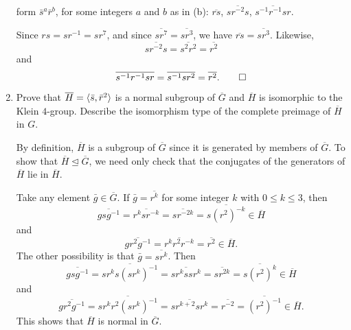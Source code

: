 \begin{enumerate}
  form $\bar s^a\bar r^b$, for some integers $a$ and $b$ as in (b):
  $\overline{rs}$, $\overline{sr^{-2}s}$, $\overline{s^{-1}r^{-1}sr}$.
  \begin{solution}
    Since $rs = sr^{-1} = sr^7$, and since
    $\overline{sr^7} = \overline{sr^3}$, we have
    $\overline{rs} = \overline{sr^3}$. Likewise,
    \begin{equation*}
      \overline{sr^{-2}s} = \overline{s^2r^2} = \overline{r^2}
    \end{equation*}
    and
    \begin{equation*}
      \overline{s^{-1}r^{-1}sr}
      = \overline{s^{-1}sr^2}
      = \overline{r^2}. \qedhere
    \end{equation*}
  \end{solution}
\item Prove that $\overline{H} = \langle{\bar s, \bar r^2}\rangle$ is a normal
  subgroup of $\overline{G}$ and $\overline{H}$ is isomorphic to the
  Klein $4$-group. Describe the isomorphism type of the complete
  preimage of $\overline{H}$ in $G$.
  \begin{solution}
    By definition, $\overline{H}$ is a subgroup of $\overline{G}$
    since it is generated by members of $\overline{G}$. To show that
    $\overline{H}\trianglelefteq\overline{G}$, we need only check that
    the conjugates of the generators of $\overline{H}$ lie in
    $\overline{H}$.

    Take any element $\bar{g}\in\overline{G}$. If
    $\bar{g} = \overline{r^k}$ for some integer $k$ with $0\leq k\leq 3$,
    then
    \begin{equation*}
      \overline{gsg^{-1}}
      = \overline{r^ksr^{-k}}
      = \overline{sr^{-2k}}
      = \overline{s(r^2)^{-k}}\in\overline{H}
    \end{equation*}
    and
    \begin{equation*}
      \overline{gr^2g^{-1}}
      = \overline{r^kr^2r^{-k}}
      = \overline{r^2}\in\overline{H}.
    \end{equation*}
    The other possibility is that $\bar{g} = \overline{sr^k}$. Then
    \begin{equation*}
      \overline{gsg^{-1}}
      = \overline{sr^ks(sr^k)^{-1}}
      = \overline{sr^kssr^k}
      = \overline{sr^{2k}}
      = \overline{s(r^2)^k}\in\overline{H}
    \end{equation*}
    and
    \begin{equation*}
      \overline{gr^2g^{-1}}
      = \overline{sr^kr^2(sr^k)^{-1}}
      = \overline{sr^{k+2}sr^k}
      = \overline{r^{-2}}
      = \overline{(r^2)^{-1}}\in\overline{H}.
    \end{equation*}
    This shows that $\overline{H}$ is normal in $\overline{G}$.


\end{solution}
\end{enumerate}
